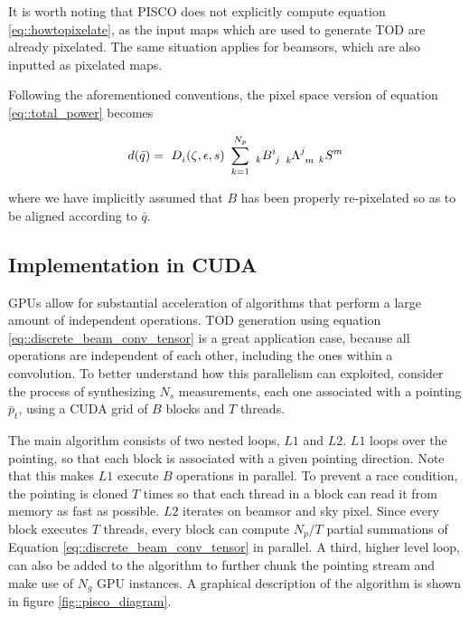\documentclass[a4paper,fleqn]{cas-dc}\sloppy
\begin{document}
\noindent
It is worth noting that PISCO does not explicitly compute equation \ref{eq::howtopixelate}, as the input maps which are used to generate TOD are already pixelated. The same situation applies for beamsors, which are also inputted as pixelated maps.

Following the aforementioned conventions, the pixel space version of equation \ref{eq::total_power} becomes

\begin{equation}
\begin{aligned}
d(\bar{q}) = \
\tensor{D}{_{i}}(\zeta,\epsilon,s) \
\sum_{k=1}^{N_p} \
\tensor[_k]{B}{^i_j} \
\tensor[_k]{\Lambda}{^j_m} \
\tensor[_k]{S}{^m}
\end{aligned}
\label{eq::discrete_beam_conv_tensor}
\end{equation}

\noindent
where we have implicitly assumed that $B$ has been properly re-pixelated so as to be aligned according to $\bar{q}$. 

\subsection{Implementation in CUDA}

GPUs allow for substantial acceleration of algorithms that perform a large amount of independent operations\cite{sanders2010cuda}. TOD generation using equation \ref{eq::discrete_beam_conv_tensor} is a great application case, because all operations are independent of each other, including the ones within a convolution. To better understand how this parallelism can exploited, consider the process of synthesizing $N_s$ measurements, each one associated with a pointing $\bar{p}_t$, using a CUDA grid of $B$ blocks and $T$ threads.

The main algorithm consists of two nested loops, $L1$ and $L2$. $L1$ loops over the pointing, so that each block is associated with a given pointing direction. Note that this makes $L1$ execute $B$ operations in parallel. To prevent a race condition, the pointing is cloned $T$ times so that each thread in a block can read it from memory as fast as possible. $L2$ iterates on beamsor and sky pixel. Since every block executes $T$ threads, every block can compute $N_p/T$ partial summations of Equation \ref{eq::discrete_beam_conv_tensor} in parallel. A third, higher level loop, can also be added to the algorithm to further chunk the pointing stream and make use of $N_g$ GPU instances. A graphical description of the algorithm is shown in figure \ref{fig::pisco_diagram}.
\end{document}
